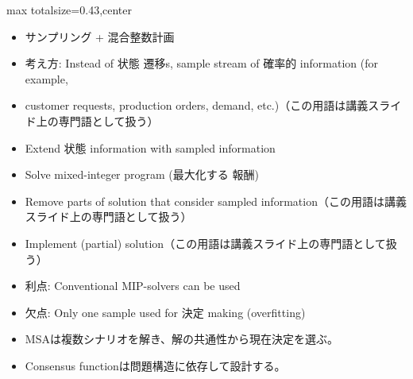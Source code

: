 \clearpage
{}
\begin{minipage}[t]{0.405\textwidth}
\begin{adjustbox}{max totalsize={\textwidth}{0.43\textheight},center}
\begin{minipage}{\textwidth}\scriptsize
{}\begin{itemize}
\item サンプリング + 混合整数計画
\item 考え方: Instead of 状態 遷移s, sample stream of 確率的 information (for example,
\item customer requests, production orders, demand, etc.)（この用語は講義スライド上の専門語として扱う）
\item Extend 状態 information with sampled information
\item Solve mixed-integer program (最大化する 報酬)
\item Remove parts of solution that consider sampled information（この用語は講義スライド上の専門語として扱う）
\item Implement (partial) solution（この用語は講義スライド上の専門語として扱う）
\item 利点: Conventional MIP-solvers can be used
\item 欠点: Only one sample used for 決定 making (overfitting)
\end{itemize}\begin{itemize}
\item MSAは複数シナリオを解き、解の共通性から現在決定を選ぶ。
\item Consensus functionは問題構造に依存して設計する。
\end{itemize}
\end{minipage}
\end{adjustbox}
\end{minipage}\hfill
